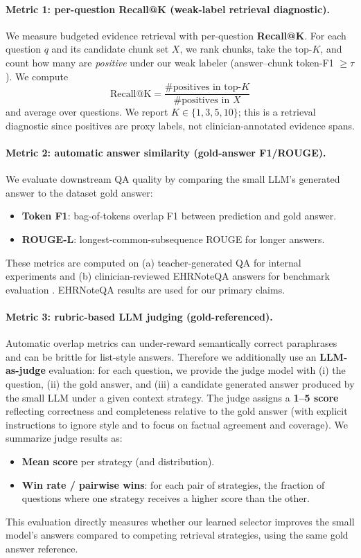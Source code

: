 \paragraph{Metric 1: per-question Recall@K (weak-label retrieval diagnostic).}
We measure budgeted evidence retrieval with per-question \textbf{Recall@K}. For each question $q$ and its candidate chunk set $X$, we rank chunks, take the top-$K$, and count how many are \emph{positive} under our weak labeler (answer--chunk token-F1 $\ge \tau$). We compute
\[
\mathrm{Recall@K}=\frac{\#\text{positives in top-$K$}}{\#\text{positives in }X}
\]
and average over questions. We report $K\in\{1,3,5,10\}$; this is a retrieval diagnostic since positives are proxy labels, not clinician-annotated evidence spans.

\paragraph{Metric 2: automatic answer similarity (gold-answer F1/ROUGE).}
We evaluate downstream QA quality by comparing the small LLM's generated answer to the dataset gold answer:
\begin{itemize}
  \item \textbf{Token F1}: bag-of-tokens overlap F1 between prediction and gold answer.
  \item \textbf{ROUGE-L}: longest-common-subsequence ROUGE for longer answers.
\end{itemize}
These metrics are computed on (a) teacher-generated QA for internal experiments and (b) clinician-reviewed EHRNoteQA answers for benchmark evaluation \citep{PhysioNet-ehr-notes-qa-llms-1.0.1}. EHRNoteQA results are used for our primary claims.

\paragraph{Metric 3: rubric-based LLM judging (gold-referenced).}
Automatic overlap metrics can under-reward semantically correct paraphrases and can be brittle for list-style answers. Therefore we additionally use an \textbf{LLM-as-judge} evaluation: for each question, we provide the judge model with (i) the question, (ii) the gold answer, and (iii) a candidate generated answer produced by the small LLM under a given context strategy. The judge assigns a \textbf{1--5 score} reflecting correctness and completeness relative to the gold answer (with explicit instructions to ignore style and to focus on factual agreement and coverage). We summarize judge results as:
\begin{itemize}
  \item \textbf{Mean score} per strategy (and distribution).
  \item \textbf{Win rate / pairwise wins}: for each pair of strategies, the fraction of questions where one strategy receives a higher score than the other.
\end{itemize}
This evaluation directly measures whether our learned selector improves the small model's answers compared to competing retrieval strategies, using the same gold answer reference.


